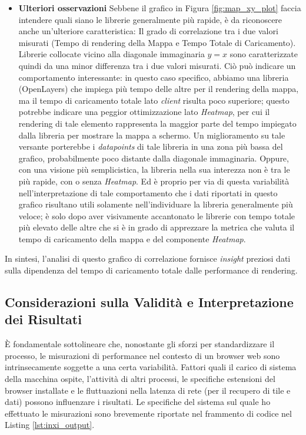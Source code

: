 \begin{itemize}
    \item \textbf{Ulteriori osservazioni}
    Sebbene il grafico in Figura \ref{fig:map_xy_plot} faccia intendere quali siano le librerie generalmente più rapide, è da riconoscere anche un'ulteriore caratteristica: Il grado di correlazione tra i due valori misurati (Tempo di rendering della Mappa e Tempo Totale di Caricamento). Librerie collocate vicino alla diagonale immaginaria $y=x$ sono caratterizzate quindi da una minor differenza tra i due valori misurati. Ciò può indicare un comportamento interessante: in questo caso specifico, abbiamo una libreria (OpenLayers) che impiega più tempo delle altre per il rendering della mappa, ma il tempo di caricamento totale lato \textit{client} risulta poco superiore; questo potrebbe indicare una peggior ottimizzazione lato \textit{Heatmap}, per cui il rendering di tale elemento rappresenta la maggior parte del tempo impiegato dalla libreria per mostrare la mappa a schermo. Un miglioramento su tale versante porterebbe i \textit{datapoints} di tale libreria in una zona più bassa del grafico, probabilmente poco distante dalla diagonale immaginaria. Oppure, con una visione più semplicistica, la libreria nella sua interezza non è tra le più rapide, con o senza \textit{Heatmap}.
    Ed è proprio per via di questa variabilità nell'interpretazione di tale comportamento che i dati riportati in questo grafico risultano utili solamente nell'individuare la libreria generalmente più veloce; è solo dopo aver visivamente accantonato le librerie con tempo totale più elevato delle altre che si è in grado di apprezzare la metrica che valuta il tempo di caricamento della mappa e del componente \textit{Heatmap}.
          
\end{itemize}

In sintesi, l'analisi di questo grafico di correlazione fornisce \textit{insight} preziosi dati sulla dipendenza del tempo di caricamento totale dalle performance di rendering.

\subsection*{Considerazioni sulla Validità e Interpretazione dei Risultati}
È fondamentale sottolineare che, nonostante gli sforzi per standardizzare il processo, le misurazioni di performance nel contesto di un browser web sono intrinsecamente soggette a una certa variabilità. Fattori quali il carico di sistema della macchina ospite, l'attività di altri processi, le specifiche estensioni del browser installate e le fluttuazioni nella latenza di rete (per il recupero di tile e dati) possono influenzare i risultati.
Le specifiche del sistema sul quale ho effettuato le misurazioni sono brevemente riportate nel frammento di codice nel Listing \ref{lst:inxi_output}.


